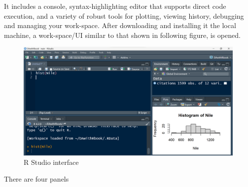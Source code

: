 \documentclass[
]{book}
\begin{document}
It includes a console, syntax-highlighting editor that supports direct code execution, and a variety of robust tools for plotting, viewing history, debugging and managing your work-space. After downloading and installing it the local machine, a work-space/UI similar to that shown in following figure, is opened.

\begin{figure}

{\centering \includegraphics[width=0.9\linewidth]{images/rstudio} 

}

\caption{R Studio interface}\label{fig:rstud}
\end{figure}

There are four panels
\end{document}
